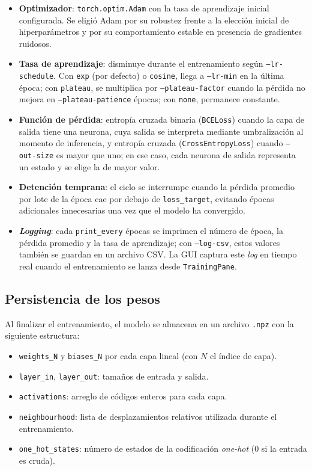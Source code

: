 \begin{itemize}
    \item \textbf{Optimizador}: \texttt{torch.optim.Adam} con la tasa de aprendizaje inicial configurada. Se eligió Adam por su robustez frente a la elección inicial de hiperparámetros y por su comportamiento estable en presencia de gradientes ruidosos.
    \item \textbf{Tasa de aprendizaje}: disminuye durante el entrenamiento según \texttt{--lr-schedule}. Con \texttt{exp} (por defecto) o \texttt{cosine}, llega a \texttt{--lr-min} en la última época; con \texttt{plateau}, se multiplica por \texttt{--plateau-factor} cuando la pérdida no mejora en \texttt{--plateau-patience} épocas; con \texttt{none}, permanece constante.
    \item \textbf{Función de pérdida}: entropía cruzada binaria (\texttt{BCELoss}) cuando la capa de salida tiene una neurona, cuya salida se interpreta mediante umbralización al momento de inferencia, y entropía cruzada (\texttt{CrossEntropyLoss}) cuando \texttt{--out-size} es mayor que uno; en ese caso, cada neurona de salida representa un estado y se elige la de mayor valor.
    \item \textbf{Detención temprana}: el ciclo se interrumpe cuando la pérdida promedio por lote de la época cae por debajo de \texttt{loss\_target}, evitando épocas adicionales innecesarias una vez que el modelo ha convergido.
    \item \textbf{\textit{Logging}}: cada \texttt{print\_every} épocas se imprimen el número de época, la pérdida promedio y la tasa de aprendizaje; con \texttt{--log-csv}, estos valores también se guardan en un archivo CSV. La GUI captura este \textit{log} en tiempo real cuando el entrenamiento se lanza desde \texttt{TrainingPane}.
\end{itemize}

\subsection{Persistencia de los pesos}

Al finalizar el entrenamiento, el modelo se almacena en un archivo \texttt{.npz} con la siguiente estructura:

\begin{itemize}
    \item \texttt{weights\_N} y \texttt{biases\_N} por cada capa lineal (con $N$ el índice de capa).
    \item \texttt{layer\_in}, \texttt{layer\_out}: tamaños de entrada y salida.
    \item \texttt{activations}: arreglo de códigos enteros para cada capa.
    \item \texttt{neighbourhood}: lista de desplazamientos relativos utilizada durante el entrenamiento.
    \item \texttt{one\_hot\_states}: número de estados de la codificación \textit{one-hot} (0 si la entrada es cruda).
\end{itemize}

